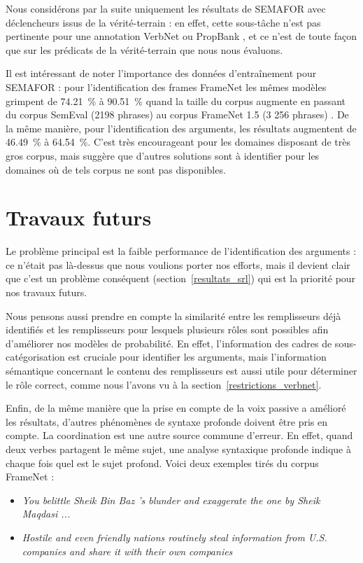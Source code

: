 Nous considérons par la suite uniquement les résultats de SEMAFOR avec
déclencheurs issus de la vérité-terrain : en effet, cette sous-tâche n'est pas
pertinente pour une annotation VerbNet ou PropBank
\citep[section~4]{das2014frame}, et ce n'est de toute façon que sur les
prédicats de la vérité-terrain que nous nous évaluons.

Il est intéressant de noter l'importance des données d'entraînement pour
SEMAFOR : pour l'identification des frames FrameNet les mêmes modèles grimpent
de 74.21~\% à 90.51~\% quand la taille du corpus augmente en passant du corpus
SemEval (2198 phrases) au corpus FrameNet 1.5 (3 256 phrases)
\citep[section~4]{das2014frame}. De la même manière, pour l'identification des
arguments, les résultats augmentent de 46.49~\% à 64.54~\%. C'est très
encourageant pour les domaines disposant de très gros corpus, mais suggère que
d'autres solutions sont à identifier pour les domaines où de tels corpus ne
sont pas disponibles.

\section{Travaux futurs}

Le problème principal est la faible performance de l'identification des
arguments : ce n'était pas là-dessus que nous voulions porter nos efforts, mais
il devient clair que c'est un problème conséquent (section~\ref{resultats_srl})
qui est la priorité pour nos travaux futurs.

Nous pensons aussi prendre en compte la similarité entre les remplisseurs déjà
identifiés et les remplisseurs pour lesquels plusieurs rôles sont possibles
afin d'améliorer nos modèles de probabilité. En effet, l'information des cadres
de sous-catégorisation est cruciale pour identifier les arguments, mais
l'information sémantique concernant le contenu des remplisseurs est aussi utile
pour déterminer le rôle correct, comme nous l'avons vu à la
section~\ref{restrictions_verbnet}.

Enfin, de la même manière que la prise en compte de la voix passive a amélioré
les résultats, d'autres phénomènes de syntaxe profonde doivent être pris en
compte. La coordination est une autre source commune d'erreur. En effet, quand
deux verbes partagent le même sujet, une analyse syntaxique profonde indique à
chaque fois quel est le sujet profond. Voici deux exemples tirés du corpus
FrameNet :

\begin{itemize}
    \item \textit{You belittle Sheik Bin Baz 's blunder and
        exaggerate the one by Sheik Maqdasi ...}
    \item \textit{Hostile and even friendly nations routinely steal information
        from U.S. companies and share it with their own companies}
\end{itemize}

